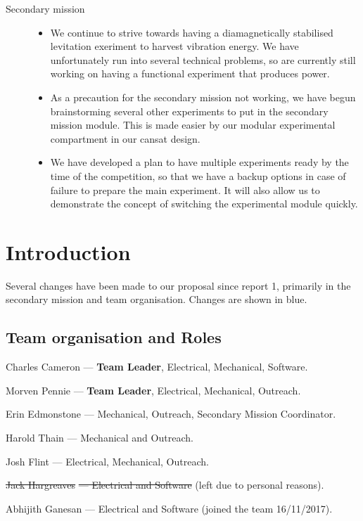 \documentclass{report}
\begin{document}
\begin{description}
		\item[Secondary mission] \hfill \begin{itemize}
			\item We continue to strive towards having a diamagnetically 
			stabilised levitation exeriment to harvest vibration energy. We have
			unfortunately run into several technical problems, so are currently
			still working on having a functional experiment that produces power.
			\item As a precaution for the secondary mission not working, we 
			have begun brainstorming several other experiments to put in the
			secondary mission module. This is made easier by our modular
			experimental compartment in our cansat design.
			\item We have developed a plan to have multiple experiments ready
			by the time of the competition, so that we have a backup options
			in case of failure to prepare the main experiment. It will also allow
			us to demonstrate the concept of switching the experimental module 
			quickly.
		\end{itemize}

	\end{description}

	\chapter{Introduction}
	Several changes have been made to our proposal since report 1, 
	primarily in the secondary mission and team organisation. 
	Changes are shown in blue.
	\section{Team organisation and Roles}
		\begin{description}
			\item{Charles Cameron} --- \textbf{Team Leader}, Electrical, 
			Mechanical, Software.
			\item{Morven Pennie} --- \textbf{Team Leader}, Electrical,
			Mechanical, Outreach.
			\item{Erin Edmonstone} --- Mechanical, Outreach, 
			{\color{blue}Secondary Mission Coordinator.}
			\item{Harold Thain} --- Mechanical and Outreach.
			\item{Josh Flint} --- Electrical, Mechanical, Outreach.
			\color{blue}
			\item{\sout{Jack Hargreaves}}\sout{ --- Electrical and Software} (left
			due to personal reasons).
			\item{Abhijith Ganesan} --- Electrical and Software (joined the team 
			16/11/2017).
	 	\end{description}
\end{document}
